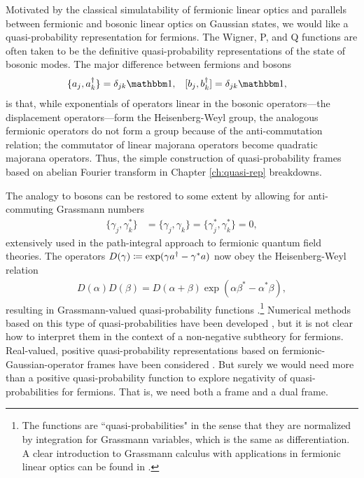 Motivated by the classical simulatability of fermionic linear optics and parallels between fermionic and bosonic linear optics on Gaussian states, we would like a quasi-probability representation for fermions. The Wigner, P, and Q functions are often taken to be the definitive quasi-probability representations of the state of bosonic modes. The major difference between fermions and bosons
\begin{align}
	\{ a_j,a\dgg_k \} &= \delta_{jk}\id, & [ b_j,b\dgg_k] &= \delta_{jk}\id,
\end{align}
is that, while exponentials of operators linear in the bosonic operators---the displacement operators---form the Heisenberg-Weyl group, the analogous fermionic operators do not form a group because of the anti-commutation relation; the commutator of linear majorana operators become quadratic majorana operators. Thus, the simple construction of quasi-probability frames based on abelian Fourier transform in Chapter \ref{ch:quasi-rep} breakdowns. 

The analogy to bosons can be restored to some extent by allowing for anti-commuting Grassmann numbers
\begin{align}
\{ \gamma_j,\gamma^*_k\} &= \{ \gamma_j,\gamma_k\} = \{ \gamma^*_j,\gamma^*_k\} =0,
\end{align}
extensively used in the path-integral approach to fermionic quantum field theories.
The operators $D(\gamma) \coloneqq \exp(\gamma a^{\dagger}-\gamma^* a)$ now obey the Heisenberg-Weyl relation
\begin{align}
D(\alpha) D(\beta) = D(\alpha + \beta) \exp ( \alpha \beta^* - \alpha^* \beta ),
\end{align}
resulting in Grassmann-valued quasi-probability functions \cite{cahill_density_1999}.\footnote{The functions are ``quasi-probabilities" in the sense that they are normalized by integration for Grassmann variables, which is the same as differentiation. A clear introduction to Grassmann calculus with applications in fermionic linear optics can be found in \cite{bravyi_lagrangian_2004}.} Numerical methods based on this type of quasi-probabilities have been developed \cite{dalton2014phase}, but it is not clear how to interpret them in the context of a non-negative subtheory for fermions. Real-valued, positive quasi-probability representations based on fermionic-Gaussian-operator frames have been considered \cite{corney_gaussian_2006-1,corney_gaussian_2006,rosales-zarate_probabilistic_2015}. But surely we would need more than a positive quasi-probability function to explore negativity of quasi-probabilities for fermions. That is, we need both a frame and a dual frame.  %

